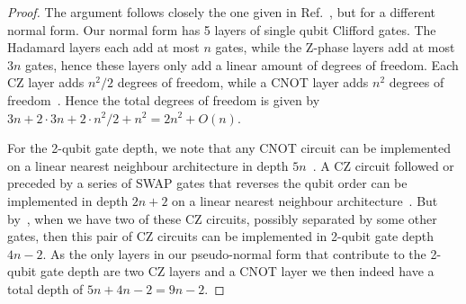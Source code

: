 \documentclass[a4paper,onecolumn,superscriptaddress,11pt,accepted=2020-04-27]{quantumarticle}
\theoremstyle{definition}
\newtheorem{remark}[theorem]{Remark}
\begin{document}
\begin{proof}
    The argument follows closely the one given in Ref.~\cite{maslov2018shorter}, but for a different normal form. Our normal form has 5 layers of single qubit Clifford gates. The Hadamard layers each add at most $n$ gates, while the Z-phase layers add at most $3n$ gates, hence these layers only add a linear amount of degrees of freedom. Each CZ layer adds $n^2/2$ degrees of freedom, while a CNOT layer adds $n^2$ degrees of freedom~\cite[Section I]{maslov2018shorter}. Hence the total degrees of freedom is given by $3n+2 \cdot 3n + 2 \cdot n^2/2 + n^2 = 2n^2 + O(n)$.

    For the 2-qubit gate depth, we note that any CNOT circuit can be implemented on a linear nearest neighbour architecture in depth $5n$~\cite{kutin2007computation}. A CZ circuit followed or preceded by a series of SWAP gates that reverses the qubit order can be implemented in depth $2n+2$ on a linear nearest neighbour architecture~\cite[Thm.~6]{maslov2018shorter}. But by~\cite[Cor. 7]{maslov2018shorter}, when we have two of these CZ circuits, possibly separated by some other gates, then this pair of CZ circuits can be implemented in 2-qubit gate depth $4n-2$. As the only layers in our pseudo-normal form that contribute to the 2-qubit gate depth are two CZ layers and a CNOT layer we then indeed have a total depth of $5n + 4n-2 = 9n - 2$.
\end{proof}

\end{document}
